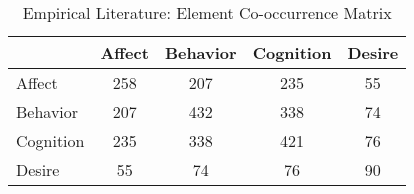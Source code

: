 \begin{table}
\begin{minipage}[t][\textheight][t]{\textwidth}

\caption{\label{tab:}Empirical Literature: Element Co-occurrence Matrix}
\begin{tabular}[t]{lcccc}
\toprule
  & Affect & Behavior & Cognition & Desire\\
\midrule
Affect & 258 & 207 & 235 & 55\\
Behavior & 207 & 432 & 338 & 74\\
Cognition & 235 & 338 & 421 & 76\\
Desire & 55 & 74 & 76 & 90\\
\bottomrule
\end{tabular}
\end{minipage}
\end{table}
